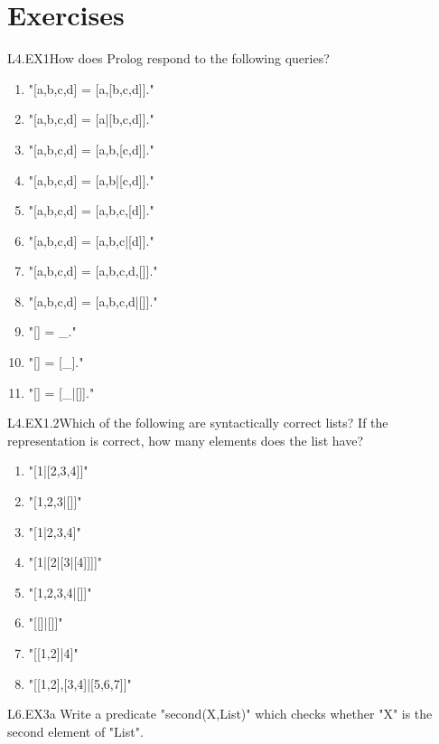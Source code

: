 \section{Exercises}\label{SEC.L4.EXERCISES}

\begin{LPNexercise}{L4.EX1}How does Prolog respond to the following queries?
\begin{enumerate}
\item{}"[a,b,c,d] = [a,[b,c,d]]."
\item{}"[a,b,c,d] = [a|[b,c,d]]."
\item{}"[a,b,c,d] = [a,b,[c,d]]."
\item{}"[a,b,c,d] = [a,b|[c,d]]."
\item{}"[a,b,c,d] = [a,b,c,[d]]."
\item{}"[a,b,c,d] = [a,b,c|[d]]."
\item{}"[a,b,c,d] = [a,b,c,d,[]]."
\item{}"[a,b,c,d] = [a,b,c,d|[]]."
\item{}"[] = \_."
\item{}"[] = [\_]."
\item{}"[] = [\_|[]]."
\end{enumerate}
\end{LPNexercise}
\begin{LPNexercise}{L4.EX1.2}Which of the following are syntactically correct lists? If the representation is correct, how many elements does the list have?

\begin{enumerate}
\item{}"[1|[2,3,4]]"
\item{}"[1,2,3|[]]"
\item{}"[1|2,3,4]"


\item{}"[1|[2|[3|[4]]]]"
\item{}"[1,2,3,4|[]]"
\item{}"[[]|[]]"
\item{}"[[1,2]|4]"
\item{}"[[1,2],[3,4]|[5,6,7]]"


\end{enumerate}
\end{LPNexercise}


\begin{LPNexercise}{L6.EX3a}
Write a predicate "second(X,List)" which checks
whether "X" is the second element of "List".
\end{LPNexercise}


